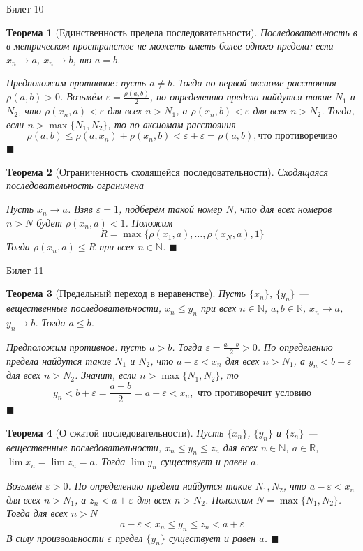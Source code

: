 \documentclass[12pt,a4paper]{article}
\newtheorem*{theorem*}{Теорема}
\begin{document}
\begin{center}
Билет 10
\end{center}

\begin{theorem*}[Единственность предела последовательности]
\label{10.1}
Последовательность в в метрическом пространстве не можеть иметь более одного предела: если $x_n \rightarrow a$, $x_n \rightarrow b$, то $a=b$.

Предположим противное: пусть $a \ne b$. Тогда по первой аксиоме расстояния $\rho(a, b) > 0$. Возьмём $\varepsilon = \frac{\rho(a, b)}{2}$, по определению предела найдутся такие $N_1$ и $N_2$, что $\rho(x_n, a) < \varepsilon$ для всех $n > N_1$, а $\rho(x_n, b) < \varepsilon$ для всех $n > N_2$. Тогда, если $n>\max\{N_1, N_2\}$, то по аксиомам расстояния
$$
\rho(a, b) \leq \rho(a, x_n) + \rho(x_n, b) < \varepsilon + \varepsilon = \rho(a, b), \text{что противоречиво}
$$ $\blacksquare$
\end{theorem*}

\begin{theorem*}[Ограниченность сходящейся последовательности]
Сходящаяся последовательность ограничена

Пусть $x_n \rightarrow a$. Взяв $\varepsilon = 1$, подберём такой номер $N$, что для всех номеров $n > N$ будет $\rho(x_n, a) < 1$. Положим
$$
R = \max\{\rho(x_1, a), \ldots, \rho(x_N, a), 1\}
$$
Тогда $\rho(x_n, a) \leq R$ при всех $n \in \mathbb{N}$. $\blacksquare$
\end{theorem*}

\begin{center}
Билет 11
\end{center}

\begin{theorem*}[Предельный переход в неравенстве]
\label{11.1}
Пусть $\{ x_n \}$, $\{ y_n \}$ --- вещественные последовательности, $x_n \leq y_n$ при всех $n \in \mathbb{N}$, $a, b \in \mathbb{R}$, $x_n \rightarrow a$, $y_n \rightarrow b$. Тогда $a \leq b$. 

Предположим противное: пусть $a > b$. Тогда $\varepsilon = \frac{a-b}{2} > 0$. По определению предела найдутся такие $N_1$ и $N_2$, что $a-\varepsilon < x_n$ для всех $n > N_1$, а $y_n < b + \varepsilon$ для всех $n > N_2$. Значит, если $n > \max\{N_1, N_2\}$, то
$$
y_n < b + \varepsilon=\frac{a+b}{2}=a-\varepsilon<x_n, \text{ что противоречит условию}
$$ $\blacksquare$
\end{theorem*}

\begin{theorem*}[О сжатой последовательности]
\label{11.2}
Пусть $\{ x_n \}$, $\{ y_n \}$ и $\{ z_n \}$ --- вещественные последовательности, $x_n \leq y_n \leq z_n$ для всех $n \in \mathbb{N}$, $a \in \mathbb{R}$, $\lim x_n = \lim z_n = a$. Тогда $\lim y_n$ существует и равен $a$.

Возьмём $\varepsilon > 0$. По определению предела найдутся такие $N_1, N_2$, что $a - \varepsilon < x_n$ для всех $n > N_1$, а $z_n < a + \varepsilon$ для всех $n > N_2$. Положим $N = \max\{N_1, N_2\}$. Тогда для всех $n > N$
$$
a - \varepsilon < x_n \leq y_n \leq z_n < a + \varepsilon
$$
В силу произвольности $\varepsilon$ предел $\{y_n\}$ существует и равен $a$. $\blacksquare$
\end{theorem*}
\end{document}
